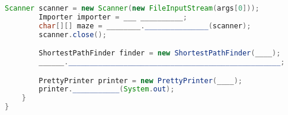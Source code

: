 \documentclass{exam}
\begin{document}
\begin{questions}
\begin{lstlisting}[language=java]
        Scanner scanner = new Scanner(new FileInputStream(args[0]));
        Importer importer = ___ __________;
        char[][] maze = ________._______________(scanner);
        scanner.close();

        ShortestPathFinder finder = new ShortestPathFinder(____);
        ______.__________________________________________________;

        PrettyPrinter printer = new PrettyPrinter(____);
        printer.___________(System.out);
    }
}
\end{lstlisting}

\end{questions}
\end{document}
